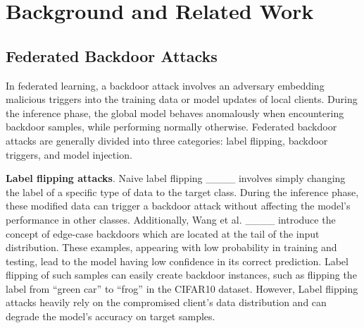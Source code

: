 \section{Background and Related Work}
\label{Sec2}

\subsection{Federated Backdoor Attacks}\label{Sec2.2}

In federated learning, a backdoor attack involves an adversary embedding malicious triggers into the training data or model updates of local clients. During the inference phase, the global model behaves anomalously when encountering backdoor samples, while performing normally otherwise. Federated backdoor attacks are generally divided into three categories: label flipping, backdoor triggers, and model injection.

\textbf{Label flipping attacks}. Naive label flipping ____ involves simply changing the label of a specific type of data to the target class. During the inference phase, these modified data can trigger a backdoor attack without affecting the model’s performance in other classes. Additionally, Wang et al. ____ introduce the concept of edge-case backdoors which are located at the tail of the input distribution. These examples, appearing with low probability in training and testing, lead to the model having low confidence in its correct prediction. Label flipping of such samples can easily create backdoor instances, such as flipping the label from “green car” to “frog” in the CIFAR10 dataset. However, Label flipping attacks heavily rely on the compromised client's data distribution and can degrade the model's accuracy on target samples.

